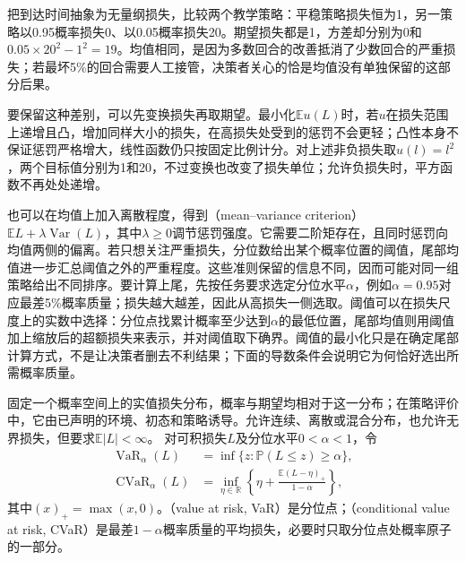 把到达时间抽象为无量纲损失，比较两个教学策略：平稳策略损失恒为1，另一策略以0.95概率损失0、以0.05概率损失20。期望损失都是1，方差却分别为0和$0.05\times20^2-1^2=19$。均值相同，是因为多数回合的改善抵消了少数回合的严重损失；若最坏5\%的回合需要人工接管，决策者关心的恰是均值没有单独保留的这部分后果。

要保留这种差别，可以先变换损失再取期望。最小化$\mathbb E u(L)$时，若$u$在损失范围上递增且凸，增加同样大小的损失，在高损失处受到的惩罚不会更轻；凸性本身不保证惩罚严格增大，线性函数仍只按固定比例计分。对上述非负损失取$u(l)=l^2$，两个目标值分别为1和20，不过变换也改变了损失单位；允许负损失时，平方函数不再处处递增。

也可以在均值上加入离散程度，得到（mean--variance criterion）$\mathbb E L+\lambda\operatorname{Var}(L)$，其中$\lambda\geq0$调节惩罚强度。它需要二阶矩存在，且同时惩罚向均值两侧的偏离。若只想关注严重损失，分位数给出某个概率位置的阈值，尾部均值进一步汇总阈值之外的严重程度。这些准则保留的信息不同，因而可能对同一组策略给出不同排序。要计算上尾，先按任务要求选定分位水平$\alpha$，例如$\alpha=0.95$对应最差5\%概率质量；损失越大越差，因此从高损失一侧选取。阈值可以在损失尺度上的实数中选择：分位点找累计概率至少达到$\alpha$的最低位置，尾部均值则用阈值加上缩放后的超额损失来表示，并对阈值取下确界。阈值的最小化只是在确定尾部计算方式，不是让决策者删去不利结果；下面的导数条件会说明它为何恰好选出所需概率质量。

\begin{definition}[损失上尾的VaR与CVaR]
  \label{def:rl-trustworthy-cvar}
  固定一个概率空间上的实值损失分布，概率与期望均相对于这一分布；在策略评价中，它由已声明的环境、初态和策略诱导。允许连续、离散或混合分布，也允许无界损失，但要求$\mathbb E|L|<\infty$。
  对可积损失$L$及分位水平$0<\alpha<1$，令
  \begin{align}
    \operatorname{VaR}_\alpha(L)
      &=\inf\{z:\mathbb P(L\leq z)\geq\alpha\}, \\
    \operatorname{CVaR}_\alpha(L)
      &=\inf_{\eta\in\mathbb R}
        \left\{\eta+\frac{\mathbb E(L-\eta)_+}{1-\alpha}\right\},
      \label{eq:rl-trustworthy-cvar}
  \end{align}
  其中$(x)_+=\max(x,0)$。（value at risk, VaR）是分位点；（conditional value at risk, CVaR）是最差$1-\alpha$概率质量的平均损失，必要时只取分位点处概率原子的一部分。
\end{definition}

